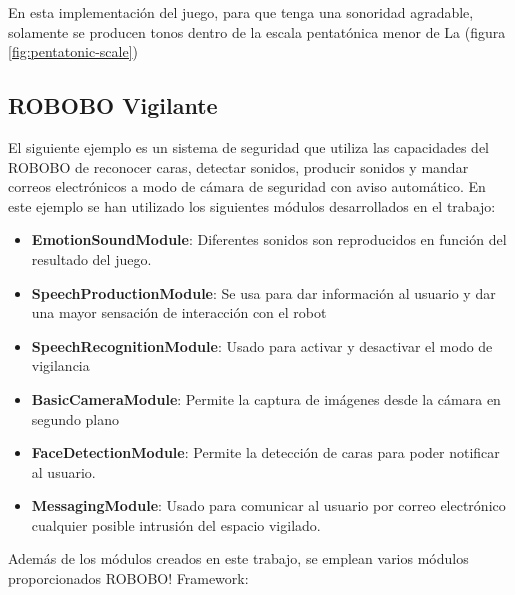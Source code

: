 \vspace{5mm} %

En esta implementación del juego, para que tenga una sonoridad agradable, solamente se producen tonos dentro de la escala pentatónica menor de La (figura \ref{fig:pentatonic-scale})






\subsection{ROBOBO Vigilante}
\label{subsec:robobo-vigilante}
El siguiente ejemplo es un sistema de seguridad que utiliza las capacidades del ROBOBO de reconocer caras, detectar sonidos, producir sonidos y mandar correos electrónicos a modo de cámara de seguridad con aviso automático.
En este ejemplo se han utilizado los siguientes módulos desarrollados en el trabajo:

\begin{itemize}
	\item \textbf{EmotionSoundModule}: Diferentes sonidos son reproducidos en función del resultado del juego.
	\item \textbf{SpeechProductionModule}: Se usa para dar información al usuario y dar una mayor sensación de interacción con el robot
	\item \textbf{SpeechRecognitionModule}: Usado para activar y desactivar el modo de vigilancia
	\item \textbf{BasicCameraModule}: Permite la captura de imágenes desde la cámara en segundo plano
	\item \textbf{FaceDetectionModule}: Permite la detección de caras para poder notificar al usuario.
	\item \textbf{MessagingModule}: Usado para comunicar al usuario por correo electrónico cualquier posible intrusión del espacio vigilado.
\end{itemize}

Además de los módulos creados en este trabajo, se emplean varios módulos proporcionados ROBOBO! Framework:

